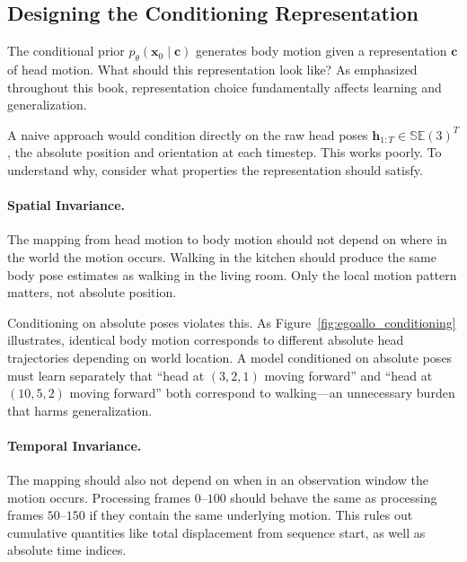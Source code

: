 \subsection{Designing the Conditioning Representation}
\label{sub:egoallo_representation}

The conditional prior $p_\theta(\boldsymbol{x}_0 \mid \boldsymbol{c})$ generates
body motion given a representation $\boldsymbol{c}$ of head motion. What
should this representation look like? As emphasized throughout this
book, representation choice fundamentally affects learning and generalization.

A naive approach would condition directly on the raw head poses
$\boldsymbol{h}_{1:T} \in \mathbb{SE}(3)^T$, the absolute position and orientation
at each timestep. This works poorly. To understand why, consider what
properties the representation should satisfy.

\paragraph{Spatial Invariance.}
The mapping from head motion to body motion should not depend on
where in the world the motion occurs. Walking in the kitchen should
produce the same body pose estimates as walking in the living room.
Only the local motion pattern matters, not absolute position.

Conditioning on absolute poses violates this. As
Figure~\ref{fig:egoallo_conditioning} illustrates, identical body
motion corresponds to different absolute head trajectories depending
on world location. A model conditioned on absolute poses must learn
separately that ``head at $(3,2,1)$ moving forward'' and ``head at
$(10,5,2)$ moving forward'' both correspond to walking---an
unnecessary burden that harms generalization.

\paragraph{Temporal Invariance.}
The mapping should also not depend on when in an observation window
the motion occurs. Processing frames $0$--$100$ should behave the
same as processing frames $50$--$150$ if they contain the same
underlying motion. This rules out cumulative quantities like total
displacement from sequence start, as well as absolute time indices.

